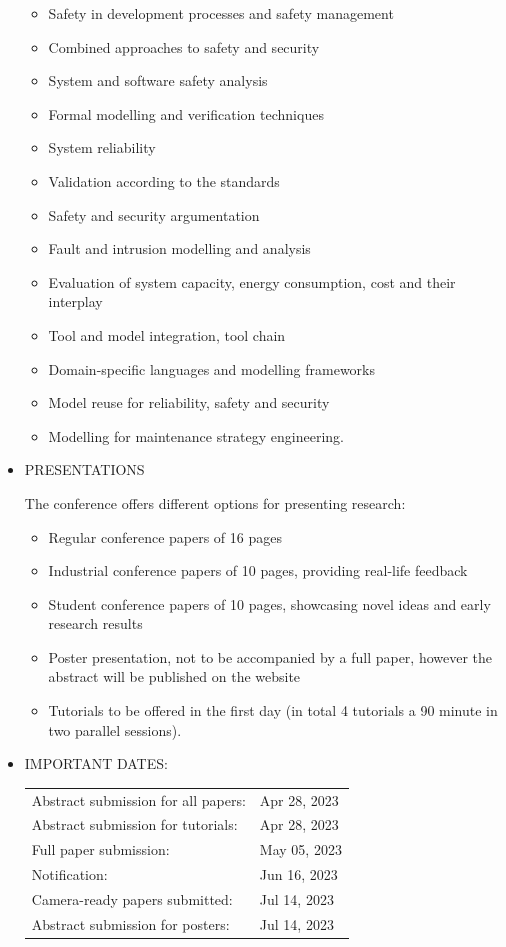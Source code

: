 \documentclass[prodmode,acmtecs]{acmsmall} %
\begin{document}
\begin{itemize}
\begin{itemize}\item  Safety in development processes and safety management
\item  Combined approaches to safety and security
\item  System and software safety analysis
\item  Formal modelling and verification techniques
\item  System reliability
\item  Validation according to the standards
\item  Safety and security argumentation
\item  Fault and intrusion modelling and analysis
\item  Evaluation of system capacity, energy consumption, cost and their interplay
\item  Tool and model integration, tool chain
\item  Domain-specific languages and modelling frameworks
\item  Model reuse for reliability, safety and security
\item  Modelling for maintenance strategy engineering.
\end{itemize} 
\item  PRESENTATIONS 
 
  The conference offers different options for presenting research: 
 
\begin{itemize}\item  Regular conference papers of 16 pages
\item  Industrial conference papers of 10 pages, providing real-life feedback
\item  Student conference papers of 10 pages, showcasing novel ideas and early research results
\item  Poster presentation, not to be accompanied by a full paper, however the abstract will be published on the website
\item  Tutorials to be offered in the first day (in total 4 tutorials a 90 minute in two parallel sessions).
\end{itemize} 
\item  IMPORTANT DATES: 
 
\begin{tabulary}{\linewidth}{LL}Abstract submission for all papers:  & Apr 28, 2023 \\
Abstract submission for tutorials:  & Apr 28, 2023 \\
Full paper submission:  & May 05, 2023 \\
Notification:  & Jun 16, 2023 \\
Camera-ready papers submitted:  & Jul 14, 2023 \\
Abstract submission for posters:  & Jul 14, 2023 \\
\end{tabulary}
 

\end{itemize}
\end{document}
